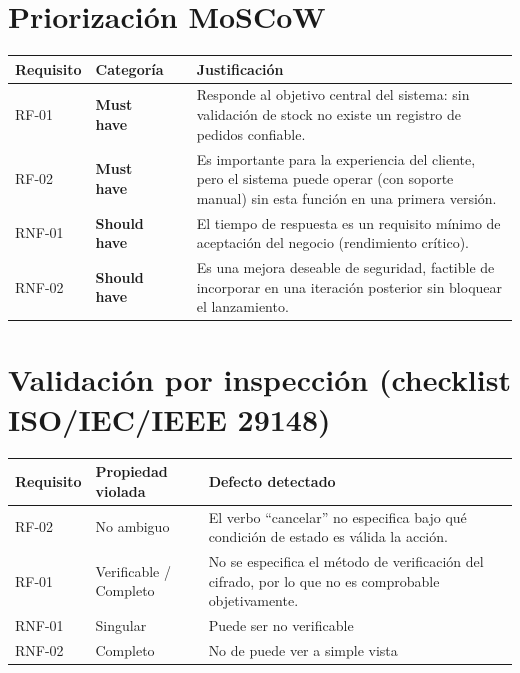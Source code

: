 \documentclass[11pt,a4paper]{article}
\begin{document}
\section{Priorizaci\'on MoSCoW}

\begin{table}[h]
\centering
\begin{tabular}{lll p{7.5cm}}
\toprule
\textbf{Requisito} & \textbf{Categor\'ia} & & \textbf{Justificaci\'on} \\
\midrule
RF-01 & \textbf{Must have} & & Responde al objetivo central del sistema: sin validaci\'on de stock no existe un registro de pedidos confiable. \\
RF-02 & \textbf{Must have} & & Es importante para la experiencia del cliente, pero el sistema puede operar (con soporte manual) sin esta funci\'on en una primera versi\'on. \\
RNF-01 & \textbf{Should have} & & El tiempo de respuesta es un requisito m\'inimo de aceptaci\'on del negocio (rendimiento cr\'itico). \\
RNF-02 & \textbf{Should have} & & Es una mejora deseable de seguridad, factible de incorporar en una iteraci\'on posterior sin bloquear el lanzamiento. \\
\bottomrule
\end{tabular}
\end{table}


\section{Validaci\'on por inspecci\'on (checklist ISO/IEC/IEEE 29148)}


\begin{table}[h]
\centering
\begin{tabular}{llp{8.5cm}}
\toprule
\textbf{Requisito} & \textbf{Propiedad violada} & \textbf{Defecto detectado} \\
\midrule
RF-02 & No ambiguo & El verbo ``cancelar'' no especifica bajo qu\'e condici\'on de estado es v\'alida la acci\'on. \\
RF-01 & Verificable / Completo & No se especifica el m\'etodo de verificaci\'on del cifrado, por lo que no es comprobable objetivamente. \\
RNF-01 & Singular & Puede ser no verificable \\
RNF-02 & Completo & No de puede ver a simple vista \\
\bottomrule
\end{tabular}

\end{table}
\end{document}
